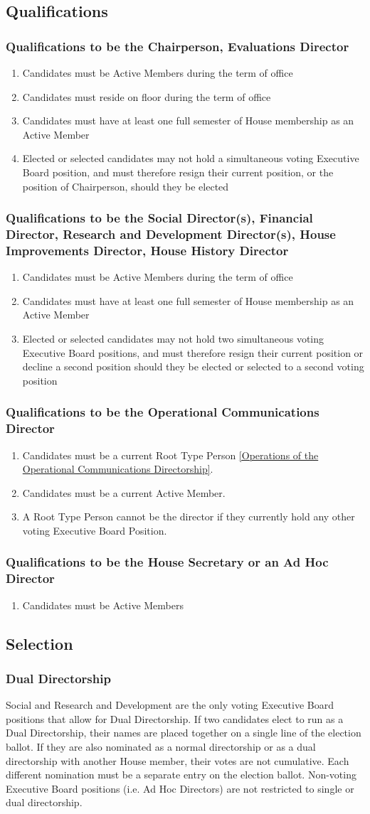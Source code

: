 \documentclass{article}
\newcommand{\asection}[1]{\subsection{#1} \label{#1}}
\newcommand{\asubsection}[1]{\subsubsection{#1} \label{#1}}
\begin{document}
\asection{Qualifications}
\asubsection{Qualifications to be the Chairperson, Evaluations Director}
\begin{enumerate}
	\item Candidates must be Active Members during the term of office
	\item Candidates must reside on floor during the term of office
	\item Candidates must have at least one full semester of House membership as an Active Member
	\item Elected or selected candidates may not hold a simultaneous voting Executive Board position, and must therefore resign their current position, or the position of Chairperson, should they be elected
\end{enumerate}
\asubsection{Qualifications to be the Social Director(s), Financial Director, Research and Development Director(s), House Improvements Director, House History Director}
\begin{enumerate}
	\item Candidates must be Active Members during the term of office
	\item Candidates must have at least one full semester of House membership as an Active Member
	\item Elected or selected candidates may not hold two simultaneous voting Executive Board positions, and must therefore resign their current position or decline a second position should they be elected or selected to a second voting position
\end{enumerate}
\asubsection{Qualifications to be the Operational Communications Director}
\begin{enumerate}
	\item Candidates must be a current Root Type Person \ref{Operations of the Operational Communications Directorship}.
	\item Candidates must be a current Active Member.
	\item A Root Type Person cannot be the director if they currently hold any other voting Executive Board Position.
\end{enumerate}

\asubsection{Qualifications to be the House Secretary or an Ad Hoc Director}
\begin{enumerate}
\item Candidates must be Active Members
\end{enumerate}

\asection{Selection}
\asubsection{Dual Directorship}
Social and Research and Development are the only voting Executive Board positions that allow for Dual Directorship.
If two candidates elect to run as a Dual Directorship, their names are placed together on a single line of the election ballot.
If they are also nominated as a normal directorship or as a dual directorship with another House member, their votes are not cumulative.
Each different nomination must be a separate entry on the election ballot.
Non-voting Executive Board positions (i.e. Ad Hoc Directors) are not restricted to single or dual directorship.
\end{document}
